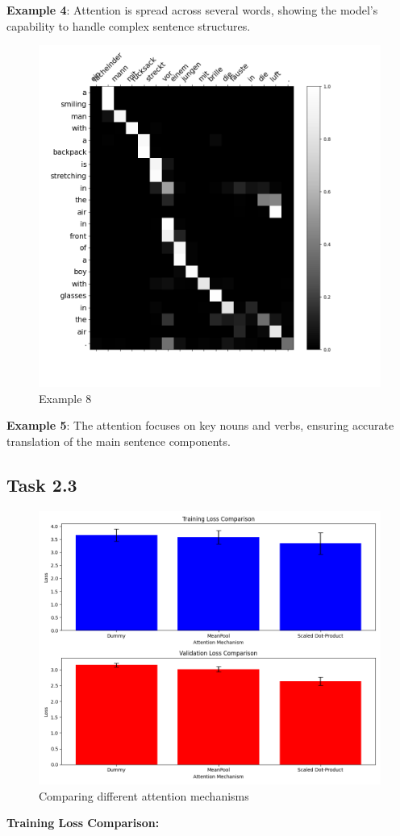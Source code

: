 \documentclass{article}
\begin{document}
\textbf{Example 4}: Attention is spread across several words, showing the model's capability to handle complex sentence structures.

\begin{figure}[H]
    \centering
    \includegraphics[width=0.8\linewidth]{759_translation.png}
    \caption{Example 8}
\end{figure}
\textbf{Example 5}: The attention focuses on key nouns and verbs, ensuring accurate translation of the main sentence components.
\pagebreak
\subsection{Task 2.3}

\begin{figure}[H]
    \centering
    \includegraphics[width=1.0\linewidth]{compare.png}
    \caption{Comparing different attention mechanisms}
    \label{fig:enter-label}
\end{figure}
\textbf{Training Loss Comparison:}
\end{document}
